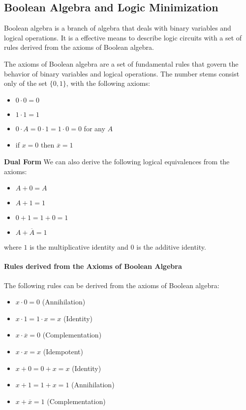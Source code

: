 \documentclass[11pt]{report}
\begin{document}
\subsection{Boolean Algebra and Logic Minimization}
\begin{definition}
    Boolean algebra is a branch of algebra that deals with binary variables and logical operations. It is a effective means to describe logic circuits with a set of rules derived from the axioms of Boolean algebra.
\end{definition}

\begin{definition}
    The axioms of Boolean algebra are a set of fundamental rules that govern the behavior of binary variables and logical operations. The number stems consist only of the set $\{0, 1\}$, with the following axioms:
    \begin{itemize}
        \item $0 \cdot 0 = 0$
        \item $1 \cdot 1 = 1$
        \item $0 \cdot A = 0 \cdot 1 = 1 \cdot 0 = 0$ for any $A$
        \item if $x=0$ then $\overline{x} = 1$
    \end{itemize}

    \textbf{Dual Form} We can also derive the following logical equivalences from the axioms:
    \begin{itemize}
        \item $A + 0 = A$
        \item $A + 1 = 1$
        \item $0 + 1 = 1 + 0 = 1$
        \item $A + \overline{A} = 1$
    \end{itemize}

    where $1$ is the multiplicative identity and $0$ is the additive identity.
\end{definition}

\paragraph{Rules derived from the Axioms of Boolean Algebra} The following rules can be derived from the axioms of Boolean algebra:
\begin{theorem}
\begin{itemize}
    \item $x \cdot 0 = 0$ (Annihilation)
    \item $x \cdot 1 = 1 \cdot x = x$ (Identity)
    \item $x \cdot \overline{x} = 0$ (Complementation)
    \item $x \cdot x = x$ (Idempotent)
    \item $x + 0 = 0 + x = x$ (Identity)
    \item $x + 1 = 1 + x = 1$ (Annihilation)
    \item $x + \overline{x} = 1$ (Complementation)
\end{itemize}
\end{theorem}
\end{document}
